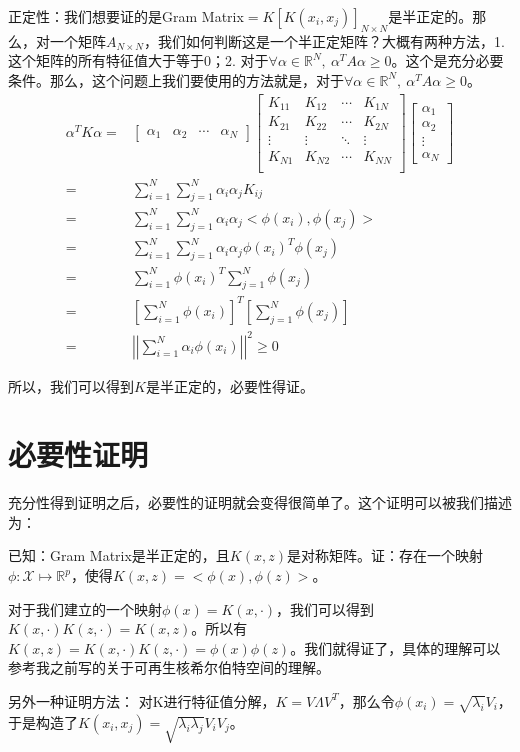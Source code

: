 \documentclass[a4paper]{article}
\begin{document}
正定性：我们想要证的是Gram Matrix$=K[K(x_i,x_j)]_{N\times N}$是半正定的。那么，对一个矩阵$A_{N\times N}$，我们如何判断这是一个半正定矩阵？大概有两种方法，1. 这个矩阵的所有特征值大于等于0；2. 对于$\forall \alpha \in \mathbb{R}^N,\ \alpha^T A \alpha \geq 0$。这个是充分必要条件。那么，这个问题上我们要使用的方法就是，对于$\forall \alpha \in \mathbb{R}^N,\ \alpha^T A \alpha \geq 0$。
\begin{align}
    \alpha^TK\alpha = & 
    \begin{bmatrix}
        \alpha_1 & \alpha_2 & \cdots & \alpha_N
    \end{bmatrix}
    \begin{bmatrix}
        K_{11} & K_{12} & \cdots & K_{1N} \\
        K_{21} & K_{22} & \cdots & K_{2N} \\
        \vdots & \vdots & \ddots & \vdots \\
        K_{N1} & K_{N2} & \cdots & K_{NN} \\
    \end{bmatrix}
    \begin{bmatrix}
        \alpha_1 \\
        \alpha_2 \\ 
        \vdots \\ 
        \alpha_N
    \end{bmatrix} \\
    = & \sum_{i=1}^N\sum_{j=1}^N \alpha_i\alpha_jK_{ij} \\
    = & \sum_{i=1}^N\sum_{j=1}^N \alpha_i\alpha_j<\phi(x_i),\phi(x_j)> \\
    = & \sum_{i=1}^N\sum_{j=1}^N \alpha_i\alpha_j\phi(x_i)^T\phi(x_j) \\ 
    = & \sum_{i=1}^N\phi(x_i)^T\sum_{j=1}^N\phi(x_j) \\
    = & \left[  \sum_{i=1}^N\phi(x_i) \right]^T \left[  \sum_{j=1}^N\phi(x_j) \right] \\
    = & \left|\left| \sum_{i=1}^N \alpha_i\phi(x_i) \right|\right|^2 \geq 0
\end{align}

所以，我们可以得到$K$是半正定的，必要性得证。

\section{必要性证明}
充分性得到证明之后，必要性的证明就会变得很简单了。这个证明可以被我们描述为：
 
已知：Gram Matrix是半正定的，且$K(x,z)$是对称矩阵。证：存在一个映射$\phi:\mathcal{X}\mapsto\mathbb{R}^p$，使得$K(x,z) = <\phi(x),\phi(z)>$。

对于我们建立的一个映射$\phi(x)= K(x,\cdot)$，我们可以得到$K(x,\cdot)K(z,\cdot) = K(x,z)$。所以有$K(x,z) = K(x,\cdot)K(z,\cdot) = \phi(x)\phi(z)$。我们就得证了，具体的理解可以参考我之前写的关于可再生核希尔伯特空间的理解。

另外一种证明方法：
对K进行特征值分解，$K=V \Lambda V^T$，那么令$\phi(x_i)=\sqrt{\lambda_i}V_i$，于是构造了$K(x_i,x_j)=\sqrt{\lambda_i\lambda_j}V_iV_j$。
\end{document}
